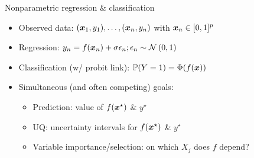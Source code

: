 \documentclass[aspectratio=199]{beamer}
\begin{document}
\begin{frame}{Nonparametric regression \& classification}

\begin{itemize}
\item{Observed data: $(\bm{x}_{1}, y_{1}), \ldots, (\bm{x}_{n}, y_{n})$ with $\bm{x}_{n} \in [0,1]^{p}$}
\item{Regression: $y_{n} = f(\bm{x}_{n}) + \sigma \epsilon_{n}; \epsilon_{n} \sim \mathcal{N}\left(0,1\right)$}
\item{Classification (w/ probit link): $\mathbb{P}(Y = 1) = \Phi(f(\bm{x}))$}
\item{Simultaneous (and often competing) goals:}
\begin{itemize}
\item{Prediction: value of $f(\bm{x}^{\star})$ \& $y^{\star}$}
\item{UQ: uncertainty intervals for $f(\bm{x}^{\star})$ \& $y^{\star}$}
\item{Variable importance/selection: on which $X_{j}$ does $f$ depend?}
\end{itemize}

\end{itemize}
\end{frame}
\end{document}
